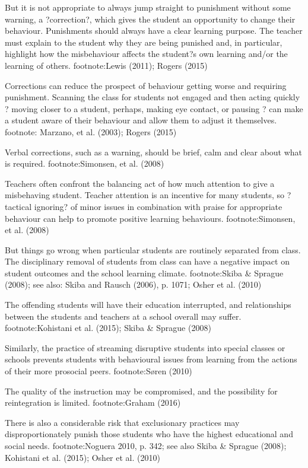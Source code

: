 But it is not appropriate to always jump straight to punishment without some warning, a ?correction?, which gives the student an opportunity to change their behaviour. Punishments should always have a clear learning purpose. The teacher must explain to the student why they are being punished and, in particular, highlight how the misbehaviour affects the student?s own learning and/or the learning of others. footnote:Lewis (2011); Rogers (2015) 

Corrections can reduce the prospect of behaviour getting worse and requiring punishment. Scanning the class for students not engaged and then acting quickly ? moving closer to a student, perhaps, making eye contact, or pausing ? can make a student aware of their behaviour and allow them to adjust it themselves. footnote: Marzano, et al. (2003); Rogers (2015)

Verbal corrections, such as a warning, should be brief, calm and clear about what is required.  footnote:Simonsen, et al. (2008)

Teachers often confront the balancing act of how much attention to give a misbehaving student. Teacher attention is an incentive for many students, so ?tactical ignoring? of minor issues in combination with praise for appropriate behaviour can help to promote positive learning behaviours. footnote:Simonsen, et al. (2008)

But things go wrong when particular students are routinely separated from class. The disciplinary removal of students from class can have a negative impact on student outcomes and the school learning climate. footnote:Skiba & Sprague (2008); see also: Skiba and Rausch (2006), p. 1071; Osher et al. (2010)  

The offending students will have their education interrupted, and relationships between the students and teachers at a school overall may suffer.  footnote:Kohistani et al. (2015); Skiba & Sprague (2008)

Similarly, the practice of streaming disruptive students into special classes or schools prevents students with behavioural issues from learning from the actions of their more prosocial peers. footnote:Søren (2010)

The quality of the instruction may be compromised, and the possibility for reintegration is limited. footnote:Graham (2016)

There is also a considerable risk that exclusionary practices may disproportionately punish those students who have the highest educational and social needs. footnote:Noguera 2010, p. 342; see also Skiba & Sprague (2008); Kohistani et al. (2015); Osher et al. (2010)

